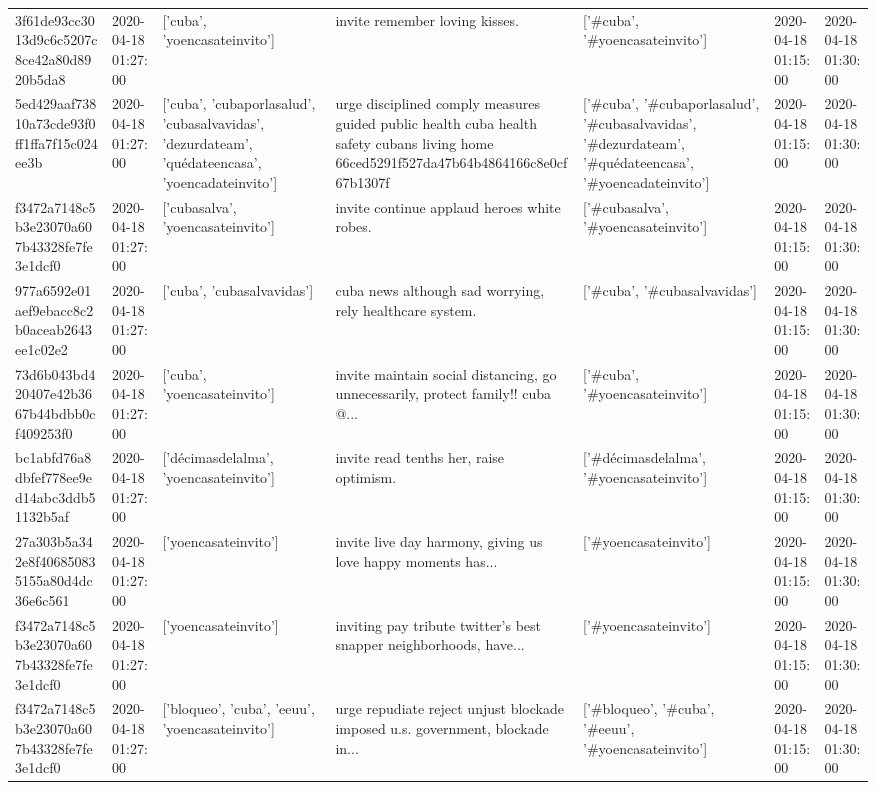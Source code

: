 \begin{tabular}{lllllll}
3f61de93cc3013d9c6c5207c8ce42a80d8920b5da8 & 2020-04-18 01:27:00 & ['cuba', 'yoencasateinvito'] & invite remember loving kisses. & ['#cuba', '#yoencasateinvito'] & 2020-04-18 01:15:00 & 2020-04-18 01:30:00 \\
5ed429aaf73810a73cde93f0ff1ffa7f15c024ee3b & 2020-04-18 01:27:00 & ['cuba', 'cubaporlasalud', 'cubasalvavidas', 'dezurdateam', 'quédateencasa', 'yoencadateinvito'] & urge disciplined comply measures guided public health cuba health safety cubans living home 66ced5291f527da47b64b4864166c8e0cf67b1307f & ['#cuba', '#cubaporlasalud', '#cubasalvavidas', '#dezurdateam', '#quédateencasa', '#yoencadateinvito'] & 2020-04-18 01:15:00 & 2020-04-18 01:30:00 \\
f3472a7148c5b3e23070a607b43328fe7fe3e1dcf0 & 2020-04-18 01:27:00 & ['cubasalva', 'yoencasateinvito'] & invite continue applaud heroes white robes. & ['#cubasalva', '#yoencasateinvito'] & 2020-04-18 01:15:00 & 2020-04-18 01:30:00 \\
977a6592e01aef9ebacc8c2b0aceab2643ee1c02e2 & 2020-04-18 01:27:00 & ['cuba', 'cubasalvavidas'] & cuba news although sad worrying, rely healthcare system. & ['#cuba', '#cubasalvavidas'] & 2020-04-18 01:15:00 & 2020-04-18 01:30:00 \\
73d6b043bd420407e42b3667b44bdbb0cf409253f0 & 2020-04-18 01:27:00 & ['cuba', 'yoencasateinvito'] & invite maintain social distancing, go unnecessarily, protect family!!️ cuba @... & ['#cuba', '#yoencasateinvito'] & 2020-04-18 01:15:00 & 2020-04-18 01:30:00 \\
bc1abfd76a8dbfef778ee9ed14abc3ddb51132b5af & 2020-04-18 01:27:00 & ['décimasdelalma', 'yoencasateinvito'] & invite read tenths her, raise optimism. & ['#décimasdelalma', '#yoencasateinvito'] & 2020-04-18 01:15:00 & 2020-04-18 01:30:00 \\
27a303b5a342e8f406850835155a80d4dc36e6c561 & 2020-04-18 01:27:00 & ['yoencasateinvito'] & invite live day harmony, giving us love happy moments has... & ['#yoencasateinvito'] & 2020-04-18 01:15:00 & 2020-04-18 01:30:00 \\
f3472a7148c5b3e23070a607b43328fe7fe3e1dcf0 & 2020-04-18 01:27:00 & ['yoencasateinvito'] & inviting pay tribute twitter's best snapper neighborhoods, have... & ['#yoencasateinvito'] & 2020-04-18 01:15:00 & 2020-04-18 01:30:00 \\
f3472a7148c5b3e23070a607b43328fe7fe3e1dcf0 & 2020-04-18 01:27:00 & ['bloqueo', 'cuba', 'eeuu', 'yoencasateinvito'] & urge repudiate reject unjust blockade imposed u.s. government, blockade in... & ['#bloqueo', '#cuba', '#eeuu', '#yoencasateinvito'] & 2020-04-18 01:15:00 & 2020-04-18 01:30:00 \\

\end{tabular}
